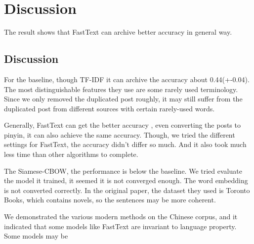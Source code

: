 \chapter{Discussion}

The result shows that FastText can archive better accuracy in general way.

\section{Discussion}


For the baseline, though TF-IDF it can archive the accuracy about 0.44(+-0.04). The most distinguishable features they use are some rarely used terminology. Since we only removed the duplicated post roughly, it may still suffer from the duplicated post from different sources with certain rarely-used words.

Generally, FastText can get the better accuracy , even converting the posts to pinyin, it can also achieve the same accuracy. Though, we tried the different settings for FastText, the accuracy didn't differ so much. And it also took much less time than other algorithms to complete.

The Siamese-CBOW, the performance is below the baseline. We tried evaluate the model it trained, it seemed it is not converged enough. The word embedding is not converted correctly. In the original paper, the dataset they used is Toronto Books, which contains novels, so the sentences may be more coherent. 

We demonstrated the various modern methods on the Chinese corpus, and it indicated that some models like FastText are invariant to language property. Some models may be  